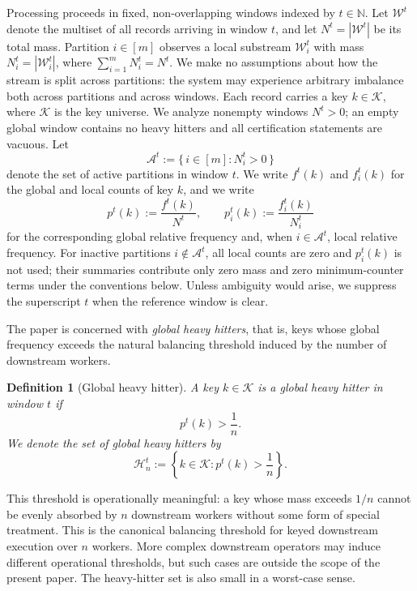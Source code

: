 \documentclass[sigconf, nonacm]{acmart}
\newtheorem{definition}{Definition}
\begin{document}
Processing proceeds in fixed, non-overlapping windows indexed by \(t \in \mathbb{N}\). Let \(\mathcal W^t\) denote the multiset of all records arriving in window \(t\), and let \(N^t = |\mathcal W^t|\) be its total mass. Partition \(i \in [m]\) observes a local substream \(\mathcal W_i^t\) with mass \(N_i^t = |\mathcal W_i^t|\), where \(\sum_{i=1}^m N_i^t = N^t\). We make no assumptions about how the stream is split across partitions: the system may experience arbitrary imbalance both across partitions and across windows. Each record carries a key \(k \in \mathcal{K}\), where \(\mathcal{K}\) is the key universe. We analyze nonempty windows \(N^t>0\); an empty global window contains no heavy hitters and all certification statements are vacuous. Let
\[
\mathcal A^t := \{\, i \in [m] : N_i^t>0 \,\}
\]
denote the set of active partitions in window \(t\). We write \(f^t(k)\) and \(f_i^t(k)\) for the global and local counts of key \(k\), and we write
\[
p^t(k) := \frac{f^t(k)}{N^t},
\qquad
p_i^t(k) := \frac{f_i^t(k)}{N_i^t}
\]
for the corresponding global relative frequency and, when \(i\in\mathcal A^t\), local relative frequency. For inactive partitions \(i\notin\mathcal A^t\), all local counts are zero and \(p_i^t(k)\) is not used; their summaries contribute only zero mass and zero minimum-counter terms under the conventions below. Unless ambiguity would arise, we suppress the superscript \(t\) when the reference window is clear.

The paper is concerned with \emph{global heavy hitters}, that is, keys whose global frequency exceeds the natural balancing threshold induced by the number of downstream workers.

\begin{definition}[Global heavy hitter]
\label{def:hh}
A key \(k \in \mathcal{K}\) is a global heavy hitter in window \(t\) if
\[
p^t(k) > \frac{1}{n}.
\]
We denote the set of global heavy hitters by
\[
\mathcal{H}_n^t := \left\{ k \in \mathcal{K} : p^t(k) > \frac{1}{n} \right\}.
\]
\end{definition}

This threshold is operationally meaningful: a key whose mass exceeds \(1/n\) cannot be evenly absorbed by \(n\) downstream workers without some form of special treatment. This is the canonical balancing threshold for keyed downstream execution over \(n\) workers. More complex downstream operators may induce different operational thresholds, but such cases are outside the scope of the present paper. The heavy-hitter set is also small in a worst-case sense.
\end{document}
